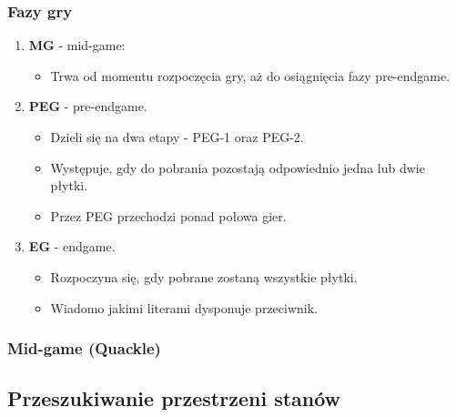 \documentclass[10pt,a4paper]{beamer}
\begin{document}
\begin{frame}
	\frametitle{Fazy gry}
	
	\begin{enumerate}
		\item \textbf{MG} - mid-game:
			\begin{itemize}
				\item Trwa od momentu rozpoczęcia gry, aż do osiągnięcia fazy pre-endgame.
			\end{itemize}
		\item \textbf{PEG} - pre-endgame.
			\begin{itemize}
				\item Dzieli się na dwa etapy - PEG-1 oraz PEG-2.
				\item Występuje, gdy do pobrania pozostają odpowiednio jedna lub dwie płytki.
				\item Przez PEG przechodzi ponad połowa gier.
			\end{itemize}
		\item \textbf{EG} - endgame.
			\begin{itemize}
				\item Rozpoczyna się, gdy pobrane zostaną wszystkie płytki.
				\item Wiadomo jakimi literami dysponuje przeciwnik.
			\end{itemize}
	\end{enumerate}
\end{frame}

\begin{frame}
	\frametitle{Mid-game (Quackle)}
	

\end{frame}

\subsection{Przeszukiwanie przestrzeni stanów}
\end{document}

